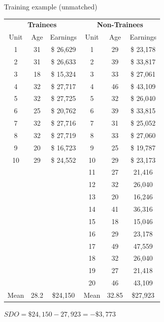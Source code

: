 \documentclass{beamer}
\begin{document}
\begin{frame}{Training example (unmatched)}

{\renewcommand{\arraystretch}{1.1}
\tabcolsep
\begin{table}[htb]\tiny{}
\centering
\begin{tabular}{ccc|ccc}
\toprule
	\multicolumn{3}{c}{\textbf{Trainees}}&
	\multicolumn{3}{c}{\textbf{Non-Trainees}}\\
	\multicolumn{1}{c}{Unit}&
	\multicolumn{1}{c}{Age}&
	\multicolumn{1}{c}{Earnings}&
	\multicolumn{1}{c}{Unit}&
	\multicolumn{1}{c}{Age}&
	\multicolumn{1}{c}{Earnings}\\
\midrule
1 & 	31 & \$	26,629 & 	1 & 	29 & \$	23,178 \\
2 & 	31 & \$	26,633 & 	2 & 	39 &\$ 	33,817 \\
3 & 	18 & 	\$	15,324 & 	3 & 	33 & \$	27,061 \\
4 & 	32 &\$ 	27,717 & 	4 & 	46 & \$	43,109 \\
5 & 	32 & \$	27,725 & 	5 & 	32 & \$	26,040 \\
6 & 	25 & \$	20,762 & 	6 & 	39 & \$	33,815 \\
7 & 	32 &\$ 	27,716 & 	7 & 	31 & \$	25,052 \\
8 & 	32 & \$	27,719 & 	8 & 	33 & \$	27,060 \\
9 & 	20 & \$	16,723 & 	9 & 	25 &\$ 	19,787 \\
10 & 	29 & \$	24,552 & 	10 & 	29 &\$ 	23,173 \\
&&&			11 & 	27 & 	21,416 \\
&&&			12 & 	32 & 	26,040 \\
&&&			13 & 	20 & 	16,246 \\
&&&			14 & 	41 & 	36,316 \\
&&&			15 & 	18 & 	15,046 \\
&&&			16 & 	29 & 	23,178 \\
&&&			17 & 	49 & 	47,559 \\
&&&			18 & 	32 & 	26,040 \\
&&&			19 & 	27 & 	21,418 \\
&&&			20 & 	46 & 	43,109 \\
\midrule
Mean & 	28.2 & 	\$24,150 & 	Mean & 	32.85 & 	\$27,923 \\
\bottomrule
\end{tabular}
$SDO = \$24,150-27,923 = -\$3,773$
\end{table}
}


\end{frame}
\end{document}
